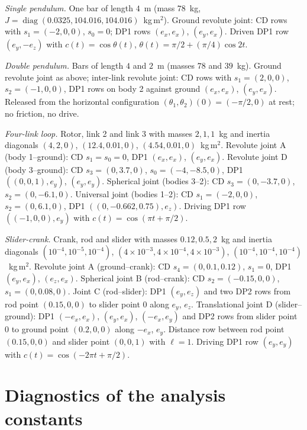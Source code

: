 \emph{Single pendulum.} One bar of length $4$~m (mass $78$~kg,
$J=\operatorname{diag}(0.0325,104.016,104.016)$~kg\,m$^2$). Ground revolute joint: CD rows with
$s_1=(-2,0,0)$, $s_0=0$; DP1 rows $(e_x,e_x)$, $(e_y,e_x)$. Driven DP1 row $(e_y,-e_z)$ with
$c(t)=\cos\theta(t)$, $\theta(t)=\pi/2+(\pi/4)\cos 2t$.

\emph{Double pendulum.} Bars of length $4$ and $2$~m (masses $78$ and $39$~kg). Ground revolute
joint as above; inter-link revolute joint: CD rows with $s_1=(2,0,0)$, $s_2=(-1,0,0)$, DP1 rows on
body 2 against ground $(e_x,e_x)$, $(e_y,e_x)$. Released from the horizontal configuration
$(\theta_1,\theta_2)(0)=(-\pi/2,0)$ at rest; no friction, no drive.

\emph{Four-link loop.} Rotor, link 2 and link 3 with masses $2,1,1$~kg and inertia diagonals
$(4,2,0)$, $(12.4,0.01,0)$, $(4.54,0.01,0)$~kg\,m$^2$. Revolute joint A (body 1--ground): CD
$s_1=s_0=0$, DP1 $(e_x,e_x)$, $(e_y,e_x)$. Revolute joint D (body 3--ground): CD $s_3=(0,3.7,0)$,
$s_0=(-4,-8.5,0)$, DP1 $((0,0,1),e_y)$, $(e_y,e_y)$. Spherical joint (bodies 3--2): CD
$s_3=(0,-3.7,0)$, $s_2=(0,-6.1,0)$. Universal joint (bodies 1--2): CD $s_1=(-2,0,0)$,
$s_2=(0,6.1,0)$, DP1 $((0,-0.662,0.75),e_z)$. Driving DP1 row $((-1,0,0),e_y)$ with
$c(t)=\cos(\pi t+\pi/2)$.

\emph{Slider-crank.} Crank, rod and slider with masses $0.12,0.5,2$~kg and inertia diagonals
$(10^{-4},10^{-5},10^{-4})$, $(4\times10^{-3},4\times10^{-4},4\times10^{-3})$,
$(10^{-4},10^{-4},10^{-4})$~kg\,m$^2$. Revolute joint A (ground--crank): CD $s_4=(0,0.1,0.12)$,
$s_1=0$, DP1 $(e_y,e_x)$, $(e_z,e_x)$. Spherical joint B (rod--crank): CD $s_2=(-0.15,0,0)$,
$s_1=(0,0.08,0)$. Joint C (rod--slider): DP1 $(e_y,e_z)$ and two DP2 rows from rod point
$(0.15,0,0)$ to slider point $0$ along $e_y$, $e_z$. Translational joint D (slider--ground): DP1
$(-e_x,e_x)$, $(e_y,e_x)$, $(-e_x,e_y)$ and DP2 rows from slider point $0$ to ground point
$(0.2,0,0)$ along $-e_x$, $e_y$. Distance row between rod point $(0.15,0,0)$ and slider point
$(0,0,1)$ with $\ell=1$. Driving DP1 row $(e_y,e_y)$ with $c(t)=\cos(-2\pi t+\pi/2)$.

\section{Diagnostics of the analysis constants}
\label{app:diagnostics}

